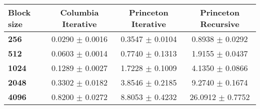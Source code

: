 \begin{tabular}{lccc}\toprule
\textbf{Block size}  & \textbf{Columbia Iterative} & \textbf{Princeton Iterative} & \textbf{Princeton Recursive}\\\midrule
\textbf{256}  & 0.0290 $\pm$ 0.0016 & 0.3547 $\pm$ 0.0104 & 0.8938 $\pm$ 0.0292\\
\textbf{512}  & 0.0603 $\pm$ 0.0014 & 0.7740 $\pm$ 0.1313 & 1.9155 $\pm$ 0.0437\\
\textbf{1024}  & 0.1289 $\pm$ 0.0027 & 1.7228 $\pm$ 0.1009 & 4.1350 $\pm$ 0.0866\\
\textbf{2048}  & 0.3302 $\pm$ 0.0182 & 3.8546 $\pm$ 0.2185 & 9.2740 $\pm$ 0.1674\\
\textbf{4096} & 0.8200 $\pm$ 0.0272 & 8.8053 $\pm$ 0.4232 & 26.0912 $\pm$ 0.7752\\
\bottomrule
\end{tabular}
